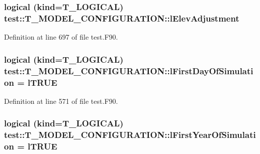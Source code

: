 \hypertarget{typetest_1_1_t___m_o_d_e_l___c_o_n_f_i_g_u_r_a_t_i_o_n_a0488eee4d6a1bda565e5066642c52f0a}{
\subsubsection[{lElevAdjustment}]{\setlength{\rightskip}{0pt plus 5cm}logical (kind={\bf T\_\-LOGICAL}) {\bf test::T\_\-MODEL\_\-CONFIGURATION::lElevAdjustment}}}
\label{typetest_1_1_t___m_o_d_e_l___c_o_n_f_i_g_u_r_a_t_i_o_n_a0488eee4d6a1bda565e5066642c52f0a}


Definition at line 697 of file test.F90.

\hypertarget{typetest_1_1_t___m_o_d_e_l___c_o_n_f_i_g_u_r_a_t_i_o_n_a4b244573439e2dc59e930a1c33a1b087}{
\subsubsection[{lFirstDayOfSimulation}]{\setlength{\rightskip}{0pt plus 5cm}logical (kind={\bf T\_\-LOGICAL}) {\bf test::T\_\-MODEL\_\-CONFIGURATION::lFirstDayOfSimulation} = {\bf lTRUE}}}
\label{typetest_1_1_t___m_o_d_e_l___c_o_n_f_i_g_u_r_a_t_i_o_n_a4b244573439e2dc59e930a1c33a1b087}


Definition at line 571 of file test.F90.

\hypertarget{typetest_1_1_t___m_o_d_e_l___c_o_n_f_i_g_u_r_a_t_i_o_n_ae0fba627f5d035d5d2dfe130ee0760d0}{
\subsubsection[{lFirstYearOfSimulation}]{\setlength{\rightskip}{0pt plus 5cm}logical (kind={\bf T\_\-LOGICAL}) {\bf test::T\_\-MODEL\_\-CONFIGURATION::lFirstYearOfSimulation} = {\bf lTRUE}}}
\label{typetest_1_1_t___m_o_d_e_l___c_o_n_f_i_g_u_r_a_t_i_o_n_ae0fba627f5d035d5d2dfe130ee0760d0}


